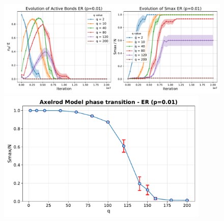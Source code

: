 \begin{figure}[htbp]
    \centering
    \begin{minipage}{0.58\textwidth}
        \centering
        \includegraphics[width=1.\textwidth]{figures/task30_plots/evolution_plot_ER.pdf}
    \end{minipage}
    \hfill
    \begin{minipage}{0.4\textwidth}
        \centering
        \includegraphics[width=0.9\textwidth]{figures/task30_plots/phase_transition_ER.pdf}
    \end{minipage}
\end{figure}

